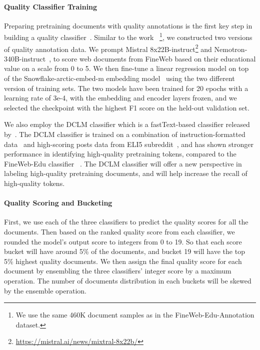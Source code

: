 \documentclass[11pt]{article}
\begin{document}
\paragraph{Quality Classifier Training}
Preparing pretraining documents with quality annotations is the first key step in building a quality classifier~\citep{dubey2024llama,abdin2024phi,yang2024qwen2}. Similar to the work ~\citep{penedo2024fineweb}\footnote{We use the same 460K document samples as in the FineWeb-Edu-Annotation dataset.}, we constructed two versions of quality annotation data. We prompt Mistral 8x22B-instruct\footnote{\url{https://mistral.ai/news/mixtral-8x22b/}} and Nemotron-340B-instruct~\citep{adler2024nemotron}, to score web documents from FineWeb based on their educational value on a scale from 0 to 5.  We then fine-tune a linear regression model on top of the Snowflake-arctic-embed-m embedding model~\citep{merrick2024arctic} using the two different version of training sets. The two models have been trained for 20 epochs with a learning rate of 3e-4, with the embedding and encoder layers frozen, and we selected the checkpoint with the highest F1 score on
the held-out validation set.

 We also employ the DCLM classifier which is a fastText-based classifier released by~\citet{li2024datacomp}. The DCLM classifier is trained on a combination of instruction-formatted data~\citep{OpenHermes} and high-scoring posts data from ELI5 subreddit~\citep{fan2019eli5}, and has shown stronger performance in identifying high-quality pretraining tokens, compared to the FineWeb-Edu classifier ~\citep{penedo2024fineweb}. The DCLM classifier will offer a new perspective in labeling high-quality pretraining documents, and will help increase the recall of high-quality tokens.

\paragraph{Quality Scoring and Bucketing}
First, we use each of the three classifiers to predict the quality scores for all the documents. Then based on the ranked quality score from each classifier, we rounded the model's output score to integers from 0 to 19. So that each score bucket will have around 5\% of the documents, and bucket 19 will have the top 5\% highest quality documents. We then assign the final quality score for each document by ensembling the three classifiers' integer score by a maximum operation. The number of documents distribution in each buckets will be skewed by the ensemble operation.
\end{document}
